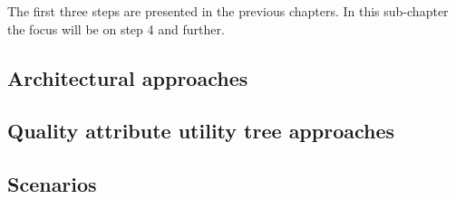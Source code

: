 The first three steps are presented in the previous chapters. In this sub-chapter the focus will be on step 4 and further. 

\subsection{Architectural approaches}

\subsection{Quality attribute utility tree approaches}

\subsection{Scenarios}





